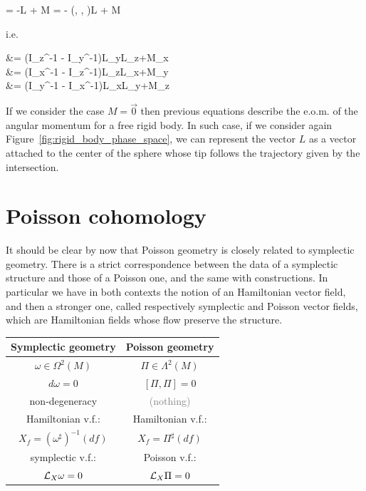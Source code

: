 \documentclass[main.tex]{subfiles}
\begin{document}
\begin{example}
	\begin{eqalign}
		 = -\omega\times L + M = - \left(, ,  \right)\times L + M
	\end{eqalign}
	i.e.
	\begin{eqalign}
		 &= (I_z^{-1} - I_y^{-1})L_yL_z+M_x\\
		 &= (I_x^{-1} - I_z^{-1})L_zL_x+M_y\\
		 &= (I_y^{-1} - I_x^{-1})L_xL_y+M_z
	\end{eqalign}
	If we consider the case $M=\vec 0$ then previous equations describe the e.o.m. of the angular momentum for a free rigid body.  In such case, if we consider again Figure~\ref{fig:rigid_body_phase_space}, we can represent the vector $L$ as a vector attached to the center of the sphere whose tip follows the trajectory given by the intersection.  
\end{example}

\section{Poisson cohomology}
\label{sec:poiss_coh}

It should be clear by now that Poisson geometry is closely related to symplectic geometry. There is a strict correspondence between the data of a symplectic structure and those of a Poisson one, and the same with constructions. In particular we have in both contexts the notion of an Hamiltonian vector field, and then a stronger one, called respectively symplectic and Poisson vector fields, which are Hamiltonian fields whose flow preserve the structure.

 \begin{center}
 	\begin{tabular}{c|c}
 		\textbf{Symplectic geometry} & \textbf{Poisson geometry}\\[1ex]
 		\hline
 		$\omega \in \Omega^2(M)$ & $\Pi \in \Lambda^2(M)$\\[1.5ex]
 		$d\omega = 0$ & $[\Pi,\Pi] = 0$\\[1.5ex]
 		non-degeneracy & \textcolor{gray}{(nothing)}\\[1.5ex]
 		Hamiltonian v.f.: & Hamiltonian v.f.:\\
 		$X_f = (\omega^\sharp)^{-1}(df)$ & $X_f = \Pi^\sharp(df)$\\[1.5ex]
 		symplectic v.f.: & Poisson v.f.:\\
 		$\mathcal{L}_{X}\omega = 0$ & $\mathcal{L}_{X}\Pi = 0$
 	\end{tabular}
 \end{center}
\end{document}

